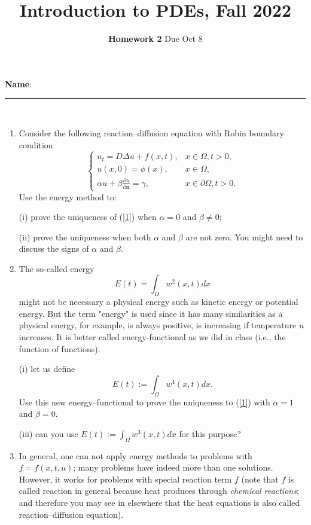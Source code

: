 \documentclass[6pt]{article}
\title{Introduction to PDEs, Fall 2022}
\author{\textbf{Homework 2} Due Oct 8}
\date{}
\numberwithin{equation}{section}
\begin{document}
\maketitle

\textbf{Name}:\rule{1 in}{0.001 in} \\
\begin{enumerate}
 \item Consider the following reaction--diffusion equation with Robin boundary condition
\begin{equation}\label{1}
\left\{
\begin{array}{ll}
u_t=D\Delta u+f(x,t),&x\in \Omega,t>0,\\
u(x,0)=\phi(x),&x\in \Omega,\\
\alpha u+\beta \frac{\partial u}{\partial \textbf{n}}=\gamma,&x \in \partial \Omega, t>0.
\end{array}
\right.
\end{equation}
Use the energy method to:

(i)  prove the uniqueness of (\ref{1}) when $\alpha=0$ and $\beta\neq 0$;

(ii) prove the uniqueness when both $\alpha$ and $\beta$ are not zero.  You might need to discuss the signs of $\alpha$ and $\beta$.

\vspace{0.2in}\item   The so-called energy
\[E(t)=\int_\Omega w^2(x,t)dx\]
might not be necessary a physical energy such as kinetic energy or potential energy.  But the term "energy" is used since it has many similarities as a physical energy, for example, is always positive, is increasing if temperature $u$ increases.  It is better called energy-functional as we did in class (i.e., the function of functions).

(i) let us define
\[E(t):=\int_\Omega w^4(x,t)dx.\]
Use this new energy--functional to prove the uniqueness to (\ref{1}) with $\alpha=1$ and $\beta=0$.

(iii)  can you use $E(t):=\int_\Omega w^3(x,t)dx$ for this purpose?


\item In general, one can not apply energy methods to problems with $f=f(x,t,u)$; many problems have indeed more than one solutions.  However, it works for problems with special reaction term $f$ (note that $f$ is called reaction in general because heat produces through \emph{chemical reactions}; and therefore you may see in elsewhere that the heat equations is also called reaction--diffusion equation).


\end{enumerate}
\end{document}

